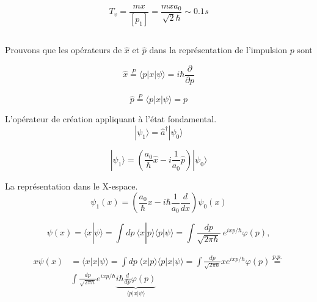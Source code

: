 \documentclass[a4paper,12pt]{article}
\begin{document}
\begin{equation}
	T_v = \frac{mx}{[p_1]}  = \frac{mxa_0}{\sqrt 2\hbar} \sim 0.1 s
\end{equation}

\subsection{}
Prouvons que les opérateurs de $\hat x$ et $\hat p$ dans la représentation de l'impulsion $p$ sont 

\begin{equation}\label{key}
	\displaystyle\hat x \overset{P}{=} {\langle p|x|\psi \rangle} =  i\hbar\frac{\partial}{\partial p} 
\end{equation}

\begin{equation}\label{key}
		\displaystyle\hat p \overset{P}{=} {\langle p|x|\psi \rangle} = p
\end{equation}

L'opérateur de création appliquant à l'état fondamental. 
\begin{equation}
	|\psi_1\rangle = \hat a^\dagger|\psi_0\rangle  
\end{equation}

\begin{equation}
	|\psi_1\rangle = \left( \frac{a_0}{\hbar}\hat x - i\frac{1} {a_0}\hat p\right)|\psi_0\rangle 
\end{equation}

La représentation dans le X-espace. 
\begin{equation}
		\psi_1(x){=} \left( \frac{a_0}{\hbar}x -i\hbar \frac{1} {a_0}\frac{d}{dx} \right)\psi_0(x) 
\end{equation}


\begin{equation}
	{\displaystyle \psi (x)=\langle x|\psi \rangle =\int \!\!dp~\langle x|p\rangle \langle p|\psi \rangle =\int \!\!\frac{dp}{{\sqrt {2\pi \hbar }}}~{e^{ixp/\hbar }{{\varphi }}(p)},}
\end{equation}

\begin{equation}
	\begin{aligned}
	\displaystyle x\psi (x)&=\langle x|x|\psi \rangle =\int \!\!dp~\langle x|p\rangle \langle p|x|\psi \rangle =\int \!\!\frac{dp}{{\sqrt {2\pi \hbar }}}x{e^{ixp/\hbar }{{\varphi }}(p)} \overset{p.p.}{=} \\ 
	&\int \!\!\frac{dp}{{\sqrt {2\pi \hbar }}}{e^{ixp/\hbar }\underbrace{i\hbar\frac{d}{dp}\varphi(p)}_{\langle p|x|\psi \rangle}} 
\end{aligned}
\end{equation}
\end{document}
